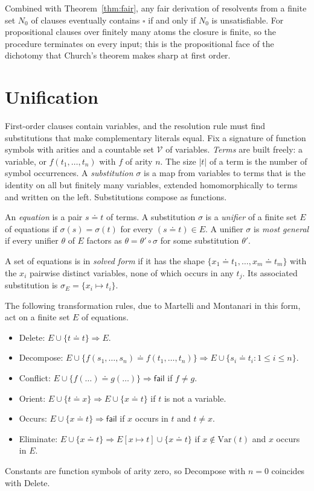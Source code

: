 Combined with Theorem~\ref{thm:fair}, any fair derivation of resolvents from a finite set $N_0$ of clauses eventually contains $\square$ if and only if $N_0$ is unsatisfiable. For propositional clauses over finitely many atoms the closure is finite, so the procedure terminates on every input; this is the propositional face of the dichotomy that Church's theorem makes sharp at first order.

\section{Unification}
\label{sec:unification}

First-order clauses contain variables, and the resolution rule must find substitutions that make complementary literals equal. Fix a signature of function symbols with arities and a countable set $\mathcal{V}$ of variables. \emph{Terms} are built freely: a variable, or $f(t_1,\dots,t_n)$ with $f$ of arity $n$. The size $|t|$ of a term is the number of symbol occurrences. A \emph{substitution} $\sigma$ is a map from variables to terms that is the identity on all but finitely many variables, extended homomorphically to terms and written on the left. Substitutions compose as functions.

An \emph{equation} is a pair $s\doteq t$ of terms. A substitution $\sigma$ is a \emph{unifier} of a finite set $E$ of equations if $\sigma(s)=\sigma(t)$ for every $(s\doteq t)\in E$. A unifier $\sigma$ is \emph{most general} if every unifier $\theta$ of $E$ factors as $\theta=\theta'\circ\sigma$ for some substitution $\theta'$.

\begin{definition}
\label{def:solved-form}
A set of equations is in \emph{solved form} if it has the shape $\{x_1\doteq t_1,\dots,x_m\doteq t_m\}$ with the $x_i$ pairwise distinct variables, none of which occurs in any $t_j$. Its associated substitution is $\sigma_E=\{x_i\mapsto t_i\}$.
\end{definition}

The following transformation rules, due to Martelli and Montanari in this form, act on a finite set $E$ of equations.
\begin{itemize}[nosep]
\item \textsf{Delete}: $E\cup\{t\doteq t\}\Rightarrow E$.
\item \textsf{Decompose}: $E\cup\{f(s_1,\dots,s_n)\doteq f(t_1,\dots,t_n)\}\Rightarrow E\cup\{s_i\doteq t_i:1\le i\le n\}$.
\item \textsf{Conflict}: $E\cup\{f(\dots)\doteq g(\dots)\}\Rightarrow\mathsf{fail}$ if $f\ne g$.
\item \textsf{Orient}: $E\cup\{t\doteq x\}\Rightarrow E\cup\{x\doteq t\}$ if $t$ is not a variable.
\item \textsf{Occurs}: $E\cup\{x\doteq t\}\Rightarrow\mathsf{fail}$ if $x$ occurs in $t$ and $t\ne x$.
\item \textsf{Eliminate}: $E\cup\{x\doteq t\}\Rightarrow E[x\mapsto t]\cup\{x\doteq t\}$ if $x\notin\mathrm{Var}(t)$ and $x$ occurs in $E$.
\end{itemize}
Constants are function symbols of arity zero, so \textsf{Decompose} with $n=0$ coincides with \textsf{Delete}.

